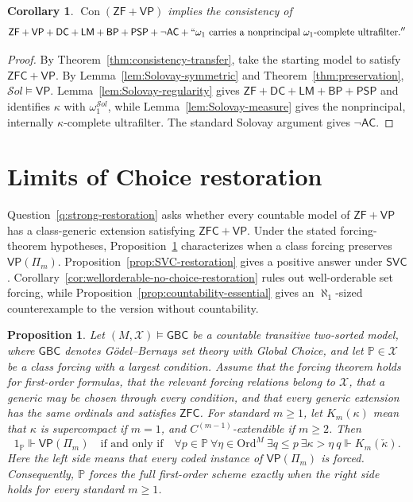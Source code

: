 \documentclass[11pt,a4paper]{amsart}
\newcommand{\VP}{\mathsf{VP}}
\newcommand{\AC}{\mathsf{AC}}
\newcommand{\ZF}{\mathsf{ZF}}
\newcommand{\ZFC}{\mathsf{ZFC}}
\newcommand{\GBC}{\mathsf{GBC}}
\newcommand{\Ord}{\mathrm{Ord}}
\newcommand{\Con}{\operatorname{Con}}
\newcommand{\DC}{\mathsf{DC}}
\newcommand{\LM}{\mathsf{LM}}
\newcommand{\BP}{\mathsf{BP}}
\newcommand{\PSP}{\mathsf{PSP}}
\theoremstyle{plain}
\newtheorem{proposition}[theorem]{Proposition}
\newtheorem{corollary}[theorem]{Corollary}
\theoremstyle{definition}
\theoremstyle{remark}
\begin{document}
\begin{corollary}\label{cor:Solovay}
$\Con(\ZF+\VP)$ implies the consistency of
\[
\ZF+\VP+\DC+\LM+\BP+\PSP+\neg\AC+
``\omega_1\text{ carries a nonprincipal }\omega_1\text{-complete ultrafilter}.''
\]
\end{corollary}

\begin{proof}
By Theorem~\ref{thm:consistency-transfer}, take the starting model to satisfy $\ZFC+\VP$.  By Lemma~\ref{lem:Solovay-symmetric} and Theorem~\ref{thm:preservation},
$\mathcal S\!ol\models\VP$.  Lemma~\ref{lem:Solovay-regularity} gives $\ZF+\DC+\LM+\BP+\PSP$ and identifies $\kappa$ with $\omega_1^{\mathcal S\!ol}$, while Lemma~\ref{lem:Solovay-measure} gives the nonprincipal, internally $\kappa$-complete ultrafilter.  The standard Solovay argument gives $\neg\AC$.
\end{proof}

\begingroup

\section{{Limits of Choice restoration}}\label{sec:class-forcing}

Question~\ref{q:strong-restoration} asks whether every countable model of $\ZF+\VP$ has a class-generic extension satisfying $\ZFC+\VP$.  Under the stated forcing-theorem hypotheses, Proposition~\ref{prop:class-forcing-criteria} characterizes when a class forcing preserves $\VP(\Pi_m)$.  Proposition~\ref{prop:SVC-restoration} gives a positive answer under $\mathsf{SVC}$.  Corollary~\ref{cor:wellorderable-no-choice-restoration} rules out well-orderable set forcing, while Proposition~\ref{prop:countability-essential} gives an $\aleph_1$-sized counterexample to the version without countability.

\begingroup

\begin{proposition}\label{prop:class-forcing-criteria}
Let $(M,\mathcal X)\models\GBC$ be a countable transitive two-sorted model, {where $\GBC$ denotes G\"odel--Bernays set theory with Global Choice}, and let $\mathbb P\in\mathcal X$ be a class forcing with a largest condition.  Assume that the forcing theorem holds for first-order formulas, that the relevant forcing relations belong to $\mathcal X$, that a generic may be chosen through every condition, and that every generic extension has the same ordinals and satisfies $\ZFC$.  For standard $m\geq1$, let $K_m(\kappa)$ mean that $\kappa$ is supercompact if $m=1$, and $C^{(m-1)}$-extendible if $m\geq2$.  Then
\[
1_{\mathbb P}\Vdash\VP(\Pi_m)\quad\text{if and only if}\quad
\forall p\in\mathbb P\ \forall\eta\in\Ord^M\ 
\exists q\leq p\ \exists\kappa>\eta\ 
q\Vdash K_m(\check\kappa).
\]
Here the left side means that every coded instance of $\VP(\Pi_m)$ is forced.  Consequently, $\mathbb P$ forces the full first-order scheme exactly when the right side holds for every standard $m\geq1$.
\end{proposition}
\end{document}
